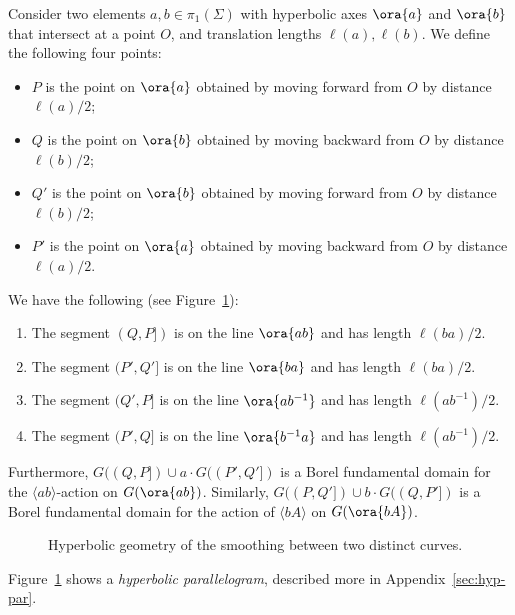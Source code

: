 \begin{proposition}
Consider two elements $a, b \in \pi_1(\Sigma)$ with hyperbolic axes $\ora{a}$ and $\ora{b}$ that intersect at a point $O$, and translation lengths $\ell(a),\ell(b)$.
We define the following four points:

\begin{itemize} \item $P$ is the point on $\ora{a}$ obtained by moving forward from $O$ by distance $\ell(a)/2$;
\item $Q$ is the point on $\ora{b}$ obtained by moving backward from $O$ by distance $\ell(b)/2$;
\item $Q'$ is the point on $\ora{b}$ obtained by moving forward from $O$ by distance $\ell(b)/2$;
\item $P'$ is the point on $\ora{a}$ obtained by moving backward from $O$ by distance $\ell(a)/2$.
\end{itemize}
We have the following (see Figure~\ref{fig:smoothing_1}):
\begin{enumerate}
\item The segment $(Q,P])$ is on the line $\ora{ab}$ and has length $\ell(ba)/2$.
\item The segment $(P',Q']$ is on the line $\ora{ba}$ and has length $\ell(ba)/2$.
\item The segment $(Q',P]$ is on the line $\ora{ab^{-1}}$ and has length $\ell(ab^{-1})/2$.
\item The segment $(P',Q]$ is on the line $\ora{b^{-1}a}$ and has length $\ell(ab^{-1})/2$.
\end{enumerate}
Furthermore, $G((Q,P])\cup a\cdot
G((P',Q'])$ is a Borel fundamental domain for the
$\langle ab \rangle$-action on $G(\ora{ab})$.
Similarly, $G((P,Q']) \cup b \cdot G((Q,P'])$ is a Borel fundamental domain for
 the action of $\langle bA\rangle$ on $G(\ora{bA})$.
\label{prop:keygeometry}
\end{proposition}

  \begin{figure}
\caption{Hyperbolic geometry of the smoothing between two distinct curves.}
\label{fig:smoothing_1}
\end{figure}

Figure~\ref{fig:smoothing_1} shows a \emph{hyperbolic parallelogram},
described more in Appendix~\ref{sec:hyp-par}.

